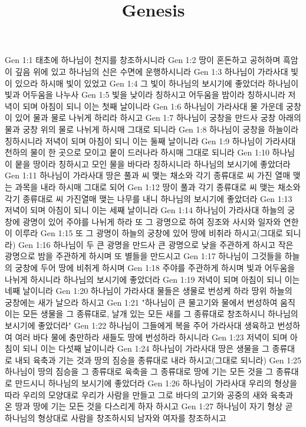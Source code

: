 

\title{Genesis}

Gen 1:1  태초에 하나님이 천지를 창조하시니라
Gen 1:2  땅이 혼돈하고 공허하며 흑암이 깊음 위에 있고 하나님의 신은 수면에 운행하시니라
Gen 1:3  하나님이 가라사대 빛이 있으라 하시매 빛이 있었고
Gen 1:4  그 빛이 하나님의 보시기에 좋았더라 하나님이 빛과 어두움을 나누사
Gen 1:5  빛을 낮이라 칭하시고 어두움을 밤이라 칭하시니라 저녁이 되며 아침이 되니 이는 첫째 날이니라
Gen 1:6  하나님이 가라사대 물 가운데 궁창이 있어 물과 물로 나뉘게 하리라 하시고
Gen 1:7  하나님이 궁창을 만드사 궁창 아래의 물과 궁창 위의 물로 나뉘게 하시매 그대로 되니라
Gen 1:8  하나님이 궁창을 하늘이라 칭하시니라 저녁이 되며 아침이 되니 이는 둘째 날이니라
Gen 1:9  하나님이 가라사대 천하의 물이 한 곳으로 모이고 뭍이 드러나라 하시매 그대로 되니라
Gen 1:10  하나님이 뭍을 땅이라 칭하시고 모인 물을 바다라 칭하시니라 하나님의 보시기에 좋았더라
Gen 1:11  하나님이 가라사대 땅은 풀과 씨 맺는 채소와 각기 종류대로 씨 가진 열매 맺는 과목을 내라 하시매 그대로 되어
Gen 1:12  땅이 풀과 각기 종류대로 씨 맺는 채소와 각기 종류대로 씨 가진열매 맺는 나무를 내니 하나님의 보시기에 좋았더라
Gen 1:13  저녁이 되며 아침이 되니 이는 세째 날이니라
Gen 1:14  하나님이 가라사대 하늘의 궁창에 광명이 있어 주야를 나뉘게 하라 또 그 광명으로 하여 징조와 사시와 일자와 연한이 이루라
Gen 1:15  또 그 광명이 하늘의 궁창에 있어 땅에 비취라 하시고(그대로 되니라)
Gen 1:16  하나님이 두 큰 광명을 만드사 큰 광명으로 낮을 주관하게 하시고 작은 광명으로 밤을 주관하게 하시며 또 별들을 만드시고
Gen 1:17  하나님이 그것들을 하늘의 궁창에 두어 땅에 비취게 하시며
Gen 1:18  주야를 주관하게 하시며 빛과 어두움을 나뉘게 하시니라 하나님의 보시기에 좋았더라
Gen 1:19  저녁이 되며 아침이 되니 이는 네째 날이니라
Gen 1:20  하나님이 가라사대 물들은 생물로 번성케 하라 땅위 하늘의 궁창에는 새가 날으라 하시고
Gen 1:21  "하나님이 큰 물고기와 물에서 번성하여 움직이는 모든 생물을 그 종류대로, 날개 있는 모든 새를 그 종류대로 창조하시니 하나님의 보시기에 좋았더라"
Gen 1:22  하나님이 그들에게 복을 주어 가라사대 생육하고 번성하여 여러 바다 물에 충만하라 새들도 땅에 번성하라 하시니라
Gen 1:23  저녁이 되며 아침이 되니 이는 다섯째 날이니라
Gen 1:24  하나님이 가라사대 땅은 생물을 그 종류대로 내되 육축과 기는 것과 땅의 짐승을 종류대로 내라 하시고(그대로 되니라)
Gen 1:25  하나님이 땅의 짐승을 그 종류대로 육축을 그 종류대로 땅에 기는 모든 것을 그 종류대로 만드시니 하나님의 보시기에 좋았더라
Gen 1:26  하나님이 가라사대 우리의 형상을 따라 우리의 모양대로 우리가 사람을 만들고 그로 바다의 고기와 공중의 새와 육축과 온 땅과 땅에 기는 모든 것을 다스리게 하자 하시고
Gen 1:27  하나님이 자기 형상 곧 하나님의 형상대로 사람을 창조하시되 남자와 여자를 창조하시고
